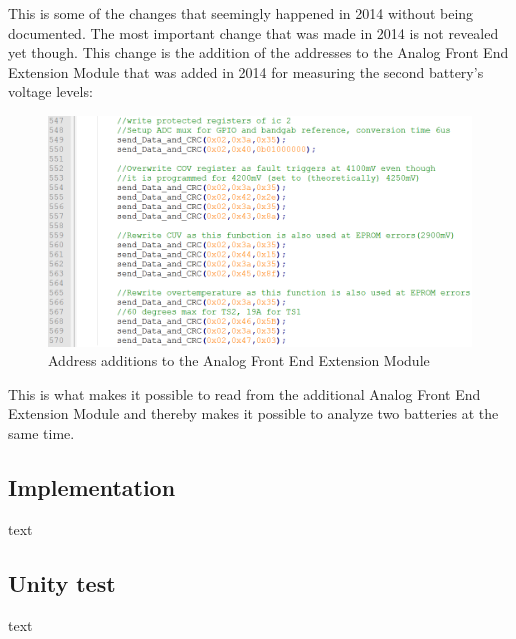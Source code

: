 This is some of the changes that seemingly happened in 2014 without being documented. The most important change that was made in 2014 is not revealed yet though. This change is the addition of the addresses to the Analog Front End Extension Module that was added in 2014 for measuring the second battery's voltage levels:\\
\begin{figure}[H]
	\centering
	\includegraphics[width=1.0\linewidth]{Software/AddressAdditionsBMS.PNG}
	\caption{Address additions to the Analog Front End Extension Module}
	\label{fig:AddressAdditions_BMS}
\end{figure}

This is what makes it possible to read from the additional Analog Front End Extension Module and thereby makes it possible to analyze two batteries at the same time.

\subsection{Implementation}
text

\subsection{Unity test}
text